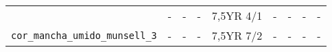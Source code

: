 \documentclass[
  a4paper,
  dvipsnames]{tufte-book}
\begin{document}
\begin{longtable}[]{@{}lllllllll@{}}
\begin{minipage}[t]{0.22\columnwidth}
\end{minipage} & \begin{minipage}[t]{0.06\columnwidth}\raggedright
-\strut
\end{minipage} & \begin{minipage}[t]{0.06\columnwidth}\raggedright
-\strut
\end{minipage} & \begin{minipage}[t]{0.07\columnwidth}\raggedright
-\strut
\end{minipage} & \begin{minipage}[t]{0.07\columnwidth}\raggedright
7,5YR 4/1\strut
\end{minipage} & \begin{minipage}[t]{0.07\columnwidth}\raggedright
-\strut
\end{minipage} & \begin{minipage}[t]{0.07\columnwidth}\raggedright
-\strut
\end{minipage} & \begin{minipage}[t]{0.07\columnwidth}\raggedright
-\strut
\end{minipage} & \begin{minipage}[t]{0.06\columnwidth}\raggedright
-\strut
\end{minipage}\tabularnewline
\begin{minipage}[t]{0.22\columnwidth}\raggedright
\texttt{cor\_mancha\_umido\_munsell\_3}\strut
\end{minipage} & \begin{minipage}[t]{0.06\columnwidth}\raggedright
-\strut
\end{minipage} & \begin{minipage}[t]{0.06\columnwidth}\raggedright
-\strut
\end{minipage} & \begin{minipage}[t]{0.07\columnwidth}\raggedright
-\strut
\end{minipage} & \begin{minipage}[t]{0.07\columnwidth}\raggedright
7,5YR 7/2\strut
\end{minipage} & \begin{minipage}[t]{0.07\columnwidth}\raggedright
-\strut
\end{minipage} & \begin{minipage}[t]{0.07\columnwidth}\raggedright
-\strut
\end{minipage} & \begin{minipage}[t]{0.07\columnwidth}\raggedright
-\strut
\end{minipage} & \begin{minipage}[t]{0.06\columnwidth}\raggedright
-\strut
\end{minipage}\tabularnewline
\bottomrule
\end{longtable}
\end{document}
